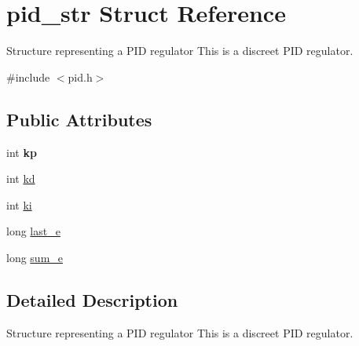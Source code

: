 \hypertarget{structpid__str}{
\section{pid\_\-str Struct Reference}
\label{structpid__str}
}


Structure representing a PID regulator This is a discreet PID regulator.  




{\ttfamily \#include $<$pid.h$>$}

\subsection*{Public Attributes}
\begin{DoxyCompactItemize}
\item 
\hypertarget{structpid__str_a7c039d6ba7d0cc9d03fe3631f5ee5811}{
int {\bfseries kp}}
\label{structpid__str_a7c039d6ba7d0cc9d03fe3631f5ee5811}

\item 
int \hyperlink{structpid__str_a0f9566f4e143fbbf1a8c4f3ab920f7cb}{kd}
\item 
int \hyperlink{structpid__str_a1246caf4496665d0d9122ae001e9bbea}{ki}
\item 
long \hyperlink{structpid__str_afba88804d3ae4faf2c06e0199d553745}{last\_\-e}
\item 
long \hyperlink{structpid__str_ab5da6edeb8d607bf45f9be8330079120}{sum\_\-e}
\end{DoxyCompactItemize}


\subsection{Detailed Description}
Structure representing a PID regulator This is a discreet PID regulator. 

